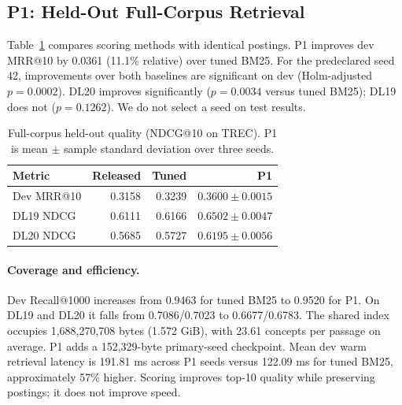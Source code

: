 \subsection{P1: Held-Out Full-Corpus Retrieval}
Table~\ref{tab:p1-quality} compares scoring methods with identical postings.
P1 improves dev MRR@10 by 0.0361 (11.1\% relative) over tuned BM25.
For the predeclared seed 42, improvements over both baselines are significant
on dev (Holm-adjusted $p=0.0002$). DL20 improves significantly ($p=0.0034$
versus tuned BM25); DL19 does not ($p=0.1262$). We do not select a seed on test results.
\begin{table}[t]
\centering
\small
\begin{tabular}{lrrr}
\hline
Metric & Released & Tuned & P1 \\
\hline
Dev MRR@10 & 0.3158 & 0.3239 & $0.3600 \pm 0.0015$ \\
DL19 NDCG & 0.6111 & 0.6166 & $0.6502 \pm 0.0047$ \\
DL20 NDCG & 0.5685 & 0.5727 & $0.6195 \pm 0.0056$ \\
\hline
\end{tabular}
\caption{Full-corpus held-out quality (NDCG@10 on TREC). P1 is mean $\pm$ sample standard deviation over three seeds.}
\label{tab:p1-quality}
\end{table}
\paragraph{Coverage and efficiency.}
Dev Recall@1000 increases from 0.9463 for tuned BM25 to 0.9520 for P1.
On DL19 and DL20 it falls from 0.7086/0.7023 to 0.6677/0.6783.
The shared index occupies 1,688,270,708 bytes (1.572 GiB), with 23.61 concepts
per passage on average. P1 adds a 152,329-byte primary-seed checkpoint.
Mean dev warm retrieval latency is 191.81 ms across P1 seeds versus 122.09 ms
for tuned BM25, approximately 57\% higher. Scoring improves top-10 quality
while preserving postings; it does not improve speed.

